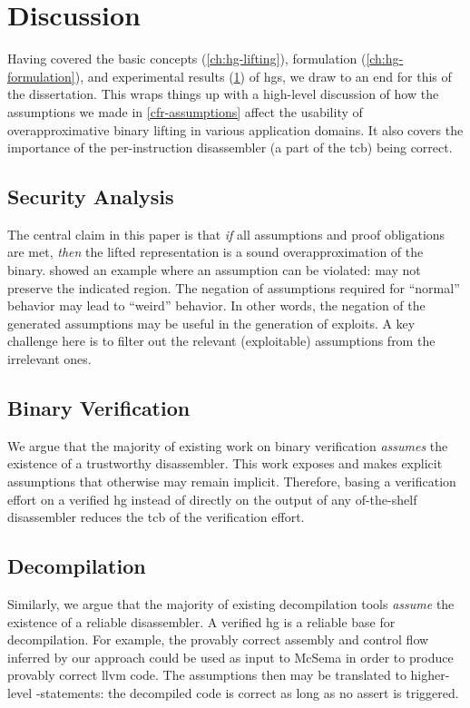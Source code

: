 \chapter{Discussion}\label{ch:hg-discussion}
Having covered the basic concepts (\cref{ch:hg-lifting}), formulation (\cref{ch:hg-formulation}), and experimental results (\cref{ch:hg-discussion}) of \acp{hg}, we draw to an end for this  of the dissertation.
This  wraps things up with a high-level discussion of how the assumptions we made in \cref{cfr-assumptions} affect the usability of overapproximative binary lifting in various application domains.
It also covers the importance of the per-instruction disassembler (a part of the \ac{tcb}) being correct.

\section{Security Analysis}
The central claim in this paper is that \emph{if} all assumptions and proof obligations are met,
\emph{then} the lifted representation is a sound overapproximation of the binary.
 showed an example where an assumption can be violated:  may not preserve the indicated region.
The negation of assumptions required for ``normal'' behavior may lead to ``weird'' behavior.
In other words, the negation of the generated assumptions may be useful in the generation of exploits.
A key challenge here is to filter out the relevant (exploitable) assumptions from the irrelevant ones.

\section{Binary Verification}
We argue that the majority of existing work on binary verification \emph{assumes} the existence of a trustworthy disassembler.
This work exposes and makes explicit assumptions that otherwise may remain implicit.
Therefore, basing a verification effort on a verified \ac{hg} instead of directly on the output of any of-the-shelf disassembler reduces the \ac{tcb} of the verification effort.

\section{Decompilation}
Similarly, we argue that the majority of existing decompilation tools \emph{assume} the existence of a reliable disassembler.
A verified \ac{hg} is a reliable base for decompilation.
For example, the provably correct assembly and control flow inferred by our approach could be used as input to McSema \autocite{dinaburg2014mcsema} in order to produce provably correct \gls{llvm} code.
The assumptions then may be translated to higher-level -statements: the decompiled code is correct as long as no assert is triggered.

